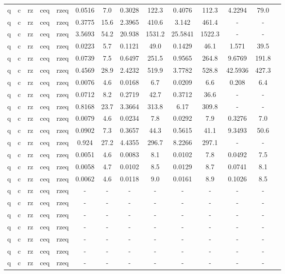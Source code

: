 \begin{table}[htb]
{\begin{tabular}{|c|c|c|c|c|c|c|c|c|c|c|c|c|c|}
q & c & rz & ceq & rzeq & 0.0516 & 7.0 & 0.3028 & 122.3 & 0.4076 & 112.3 & 4.2294 & 79.0 \\ 
q & c & rz & ceq & rzeq & 0.3775 & 15.6 & 2.3965 & 410.6 & 3.142 & 461.4 & - & - \\ 
q & c & rz & ceq & rzeq & 3.5693 & 54.2 & 20.938 & 1531.2 & 25.5841 & 1522.3 & - & - \\ 
q & c & rz & ceq & rzeq & 0.0223 & 5.7 & 0.1121 & 49.0 & 0.1429 & 46.1 & 1.571 & 39.5 \\ 
q & c & rz & ceq & rzeq & 0.0739 & 7.5 & 0.6497 & 251.5 & 0.9565 & 264.8 & 9.6769 & 191.8 \\ 
q & c & rz & ceq & rzeq & 0.4569 & 28.9 & 2.4232 & 519.9 & 3.7782 & 528.8 & 42.5936 & 427.3 \\ 
q & c & rz & ceq & rzeq & 0.0076 & 4.6 & 0.0168 & 6.7 & 0.0209 & 6.6 & 0.208 & 6.4 \\ 
q & c & rz & ceq & rzeq & 0.0712 & 8.2 & 0.2719 & 42.7 & 0.3712 & 36.6 & - & - \\ 
q & c & rz & ceq & rzeq & 0.8168 & 23.7 & 3.3664 & 313.8 & 6.17 & 309.8 & - & - \\ 
q & c & rz & ceq & rzeq & 0.0079 & 4.6 & 0.0234 & 7.8 & 0.0292 & 7.9 & 0.3276 & 7.0 \\ 
q & c & rz & ceq & rzeq & 0.0902 & 7.3 & 0.3657 & 44.3 & 0.5615 & 41.1 & 9.3493 & 50.6 \\ 
q & c & rz & ceq & rzeq & 0.924 & 27.2 & 4.4355 & 296.7 & 8.2266 & 297.1 & - & - \\ 
q & c & rz & ceq & rzeq & 0.0051 & 4.6 & 0.0083 & 8.1 & 0.0102 & 7.8 & 0.0492 & 7.5 \\ 
q & c & rz & ceq & rzeq & 0.0058 & 4.7 & 0.0102 & 8.5 & 0.0129 & 8.7 & 0.0741 & 8.1 \\ 
q & c & rz & ceq & rzeq & 0.0062 & 4.6 & 0.0118 & 9.0 & 0.0161 & 8.9 & 0.1026 & 8.5 \\ 
q & c & rz & ceq & rzeq & - & - & - & - & - & - & - & - \\ 
q & c & rz & ceq & rzeq & - & - & - & - & - & - & - & - \\ 
q & c & rz & ceq & rzeq & - & - & - & - & - & - & - & - \\ 
q & c & rz & ceq & rzeq & - & - & - & - & - & - & - & - \\ 
q & c & rz & ceq & rzeq & - & - & - & - & - & - & - & - \\ 
q & c & rz & ceq & rzeq & - & - & - & - & - & - & - & - \\ 
q & c & rz & ceq & rzeq & - & - & - & - & - & - & - & - \\ 

\end{tabular}}
\end{table}
